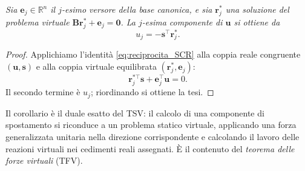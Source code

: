 
\medskip
\emph{	Sia $\bm e_j\in\mathbb R^n$ il $j$-esimo versore della base
	canonica, e sia $\bm r^*_j$ una soluzione del
	\emph{problema virtuale} $\bm B\bm r^*_j+\bm e_j=\bm 0$. La
	$j$-esima componente di $\bm u$ si ottiene da
	\begin{equation}\label{eq:carico_unitario}
		u_j = -\bm s^{\top}\bm r^*_j.
	\end{equation}
}

\medskip

\begin{proof}
	Applichiamo l'identità \eqref{eq:reciprocita_SCR} alla
	coppia reale congruente $(\bm u,\bm s)$ e alla coppia
	virtuale equilibrata $(\bm r_j^*,\bm e_j)$:
	\[
	\bm r_j^{*\top}\bm s+\bm e_j^\top\bm u=0.
	\]
	Il secondo termine è $u_j$; riordinando si ottiene la tesi.
\end{proof}
\begin{oss}
	Il corollario è il duale esatto del TSV: il calcolo di una
	componente di spostamento si riconduce a un problema
	statico virtuale, applicando una forza generalizzata
	unitaria nella direzione corrispondente e calcolando il
	lavoro delle reazioni virtuali nei cedimenti reali
	assegnati. È il contenuto del \emph{teorema delle forze
		virtuali} (TFV).
\end{oss}
